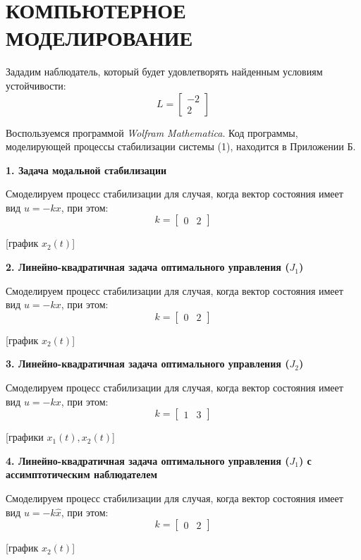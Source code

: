 \chapter{\MakeUppercase{Компьютерное моделирование}}

Зададим наблюдатель, который будет удовлетворять найденным условиям устойчивости:
$$
L=\begin{bmatrix}
    -2 \\ 2
\end{bmatrix}
$$

Воспользуемся программой \textit{Wolfram Mathematica}. Код программы, моделирующей процессы стабилизации системы (1), находится в Приложении Б.

\textbf{1. Задача модальной стабилизации}

Смоделируем процесс стабилизации для случая, когда вектор состояния имеет вид $ u=-kx $, при этом:
$$
k=\begin{bmatrix} 0 & 2 \end{bmatrix}
$$

[график $ x_2(t) $]

\textbf{2. Линейно-квадратичная задача оптимального управления ($ J_1 $)}

Смоделируем процесс стабилизации для случая, когда вектор состояния имеет вид $ u=-kx $, при этом:
$$
k = \begin{bmatrix} 0 & 2 \end{bmatrix}
$$

[график $ x_2(t) $]

\textbf{3. Линейно-квадратичная задача оптимального управления ($ J_2 $)}

Смоделируем процесс стабилизации для случая, когда вектор состояния имеет вид $ u=-kx $, при этом:
$$
k = \begin{bmatrix} 1 & 3 \end{bmatrix}
$$

[графики $ x_1(t), x_2(t) $]

\textbf{4. Линейно-квадратичная задача оптимального управления ($ J_1 $) с ассимптотическим наблюдателем }

Смоделируем процесс стабилизации для случая, когда вектор состояния имеет вид $ u=-k\hat{x} $, при этом:
$$
k = \begin{bmatrix} 0 & 2 \end{bmatrix}
$$

[график $ x_2(t) $]
